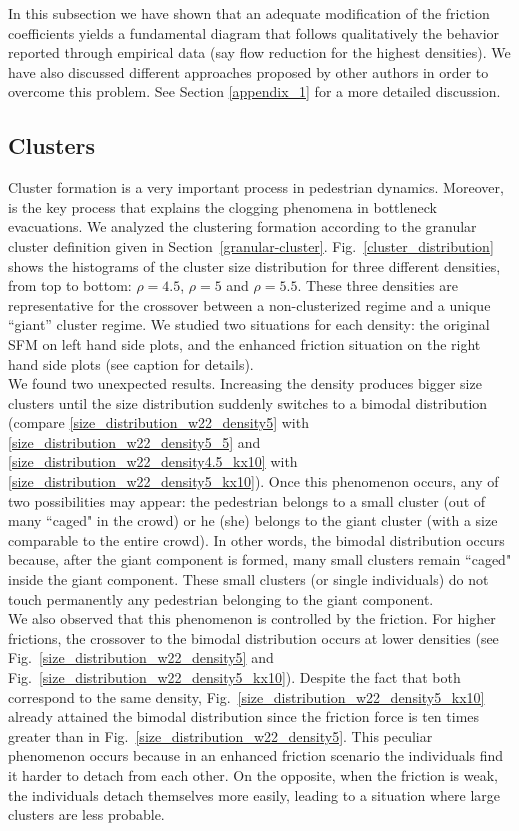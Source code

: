 \documentclass[preprint,12pt]{elsarticle}
\begin{document}
In this subsection we have shown that an adequate modification of the friction coefficients yields a fundamental diagram that follows qualitatively the behavior reported through empirical data (say flow reduction for the highest densities). We have also discussed different approaches proposed by other authors in order to overcome this problem. See Section \ref{appendix_1} for a more detailed discussion.\\

\subsection{\label{clusters}Clusters}

Cluster formation is a very important process in pedestrian dynamics. Moreover, is the key process that explains the clogging phenomena in bottleneck evacuations. We analyzed the clustering formation according to the granular cluster definition given in Section~\ref{granular-cluster}. Fig.~\ref{cluster_distribution} shows the histograms of the cluster size distribution for three different densities, from top to bottom: $\rho=4.5$, $\rho=5$ and $\rho=5.5$. These three
densities are representative for the crossover between
a non-clusterized regime and a unique “giant” cluster
regime. We studied two situations for each density: the
original SFM on left hand side plots, and the enhanced
friction situation on the right hand side plots (see
caption for details).\\

We found two unexpected results. Increasing the density produces bigger size clusters until the size distribution suddenly switches to a bimodal distribution (compare \ref{size_distribution_w22_density5} with \ref{size_distribution_w22_density5_5} and \ref{size_distribution_w22_density4.5_kx10} with \ref{size_distribution_w22_density5_kx10}). Once
this phenomenon occurs, any of two possibilities may
appear: the pedestrian belongs to a small cluster (out
of many ``caged" in the crowd) or he (she) belongs to the
giant cluster (with a size comparable to the entire crowd).
In other words, the bimodal distribution occurs because,
after the giant component is formed, many small clusters remain ``caged" 
inside the giant component. These small clusters (or single individuals)
do not touch permanently any pedestrian belonging to the giant component. \\

We also observed that this phenomenon is controlled by the friction. For higher frictions, the crossover to the bimodal distribution occurs at lower densities (see Fig.~\ref{size_distribution_w22_density5} and Fig.~\ref{size_distribution_w22_density5_kx10}). Despite the fact that both correspond to the same density, Fig.~\ref{size_distribution_w22_density5_kx10} already attained the bimodal distribution since the friction force is ten times greater than in Fig.~\ref{size_distribution_w22_density5}. This peculiar phenomenon
occurs because in an enhanced friction scenario the
individuals find it harder to detach from each other. On
the opposite, when the friction is weak, the individuals
detach themselves more easily, leading to a situation
where large clusters are less probable.\\
\end{document}

